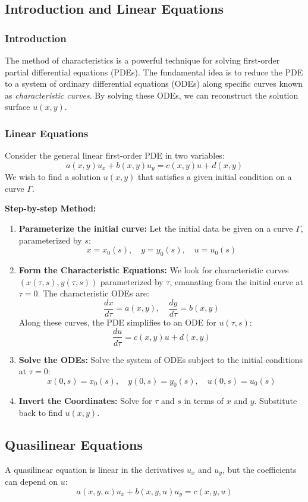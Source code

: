 \documentclass[11pt]{article}
\theoremstyle{plain}
\theoremstyle{definition}
\theoremstyle{remark}
\begin{document}
\subsection{Introduction and Linear Equations}
\subsubsection{Introduction}
The method of characteristics is a powerful technique for solving first-order partial differential equations (PDEs). The fundamental idea is to reduce the PDE to a system of ordinary differential equations (ODEs) along specific curves known as \textit{characteristic curves}. By solving these ODEs, we can reconstruct the solution surface $u(x,y)$.

\subsubsection{Linear Equations}
Consider the general linear first-order PDE in two variables:
\begin{equation}
a(x,y) u_x + b(x,y) u_y = c(x,y) u + d(x,y)
\end{equation}
We wish to find a solution $u(x,y)$ that satisfies a given initial condition on a curve $\Gamma$.

\textbf{Step-by-step Method:}
\begin{enumerate}
    \item \textbf{Parameterize the initial curve:} Let the initial data be given on a curve $\Gamma$, parameterized by $s$:
    $$ x = x_0(s), \quad y = y_0(s), \quad u = u_0(s) $$
    \item \textbf{Form the Characteristic Equations:} We look for characteristic curves $(x(\tau, s), y(\tau, s))$ parameterized by $\tau$, emanating from the initial curve at $\tau = 0$. The characteristic ODEs are:
    $$ \frac{dx}{d\tau} = a(x,y), \quad \frac{dy}{d\tau} = b(x,y) $$
    Along these curves, the PDE simplifies to an ODE for $u(\tau, s)$:
    $$ \frac{du}{d\tau} = c(x,y) u + d(x,y) $$
    \item \textbf{Solve the ODEs:} Solve the system of ODEs subject to the initial conditions at $\tau=0$:
    $$ x(0,s) = x_0(s), \quad y(0,s) = y_0(s), \quad u(0,s) = u_0(s) $$
    \item \textbf{Invert the Coordinates:} Solve for $\tau$ and $s$ in terms of $x$ and $y$. Substitute back to find $u(x,y)$.
\end{enumerate}

\subsection{Quasilinear Equations}
A quasilinear equation is linear in the derivatives $u_x$ and $u_y$, but the coefficients can depend on $u$:
\begin{equation}
a(x,y,u) u_x + b(x,y,u) u_y = c(x,y,u)
\end{equation}
\end{document}
